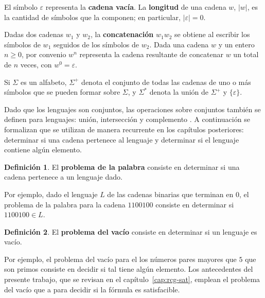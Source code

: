 \documentclass{report}
\theoremstyle{definition}
\newtheorem{definicion}{Definición}[chapter]
\theoremstyle{plain}
\theoremstyle{remark}
\begin{document}
El símbolo $\varepsilon$ representa la \textbf{cadena vacía}. La \textbf{longitud} de una cadena $w$,  $|w|$, es la cantidad de símbolos que la componen; en particular, $|\varepsilon| = 0$. 

Dadas dos cadenas $w_1$ y $w_2$, la \textbf{concatenación} $w_1 w_2$ se obtiene al escribir los símbolos de $w_1$ seguidos de los símbolos de $w_2$. Dada una cadena $w$ y un entero $n \ge 0$, por convenio $w^n$ representa la cadena resultante de concatenar $w$ un total de $n$ veces, con $w^0 = \varepsilon$. 

Si $\Sigma$ es un alfabeto, $\Sigma^+$ denota el conjunto de todas las cadenas de uno o más símbolos que se pueden formar sobre $\Sigma$, y $\Sigma^*$ denota la unión de $\Sigma^+$ y $\{\varepsilon\}$.

Dado que los lenguajes son conjuntos, las operaciones sobre conjuntos también se definen para lenguajes: unión, intersección y complemento \cite{hopcroft2006introduction}. A continuación se formalizan  que se utilizan de manera recurrente en los capítulos posteriores: determinar si una cadena pertenece al lenguaje y determinar si el lenguaje contiene algún elemento.

\begin{definicion}
  El \textbf{problema de la palabra} consiste en determinar si una cadena pertenece a un lenguaje dado.
\end{definicion}

Por ejemplo, dado el lenguaje $L$ de las cadenas binarias que terminan en $0$, el problema de la palabra para la cadena $1100100$ consiste en determinar si $1100100 \in L$.

\begin{definicion}
  El \textbf{problema del vacío} consiste en determinar si un lenguaje es vacío.
\end{definicion}

Por ejemplo, el problema del vacío para el  los números pares mayores que $5$ que  son primos consiste en decidir si tal  tiene algún elemento. Los antecedentes del presente trabajo, que se revisan en el capítulo~\ref{cap:rcg-sat}, emplean el problema del vacío  que  a  para decidir si la fórmula es satisfacible.
\end{document}
